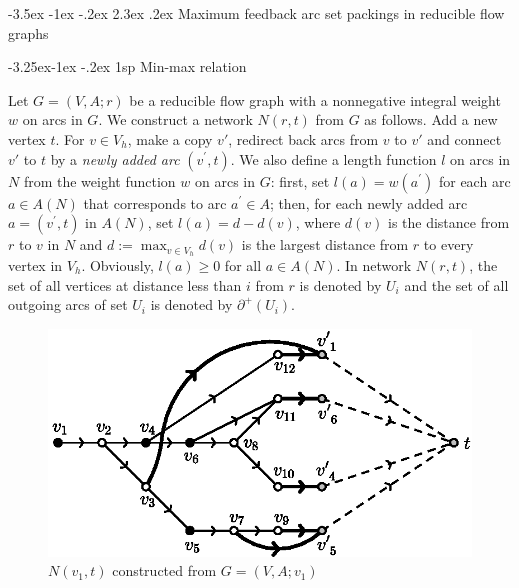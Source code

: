 \documentclass[11pt]{article}
\makeatletter
\renewcommand\section{%
  \@startsection{section}{1}
                {\z@}%
                {-3.5ex \@plus -1ex \@minus -.2ex}%
                {2.3ex \@plus.2ex}%
                {\large\bfseries}%
}
\renewcommand\subsection{%
  \@startsection{subsection}{2}
                {\z@}%
                {-3.25ex\@plus -1ex \@minus -.2ex}%
                {1sp}%
                {\normalsize\bfseries}%
}
\makeatother
\begin{document}
\section{Maximum feedback arc set packings in reducible flow graphs}
\label{sec:3}

\subsection{Min-max relation}
\label{sec:4}

Let $G=(V,A;r)$ be a reducible flow graph with a nonnegative integral weight $w$ on arcs in $G$. We construct a network $N(r,t)$ from $G$ as follows. Add a new vertex $t$. For $v\in V_h$, make a copy $v'$, redirect back arcs from $v$ to $v'$ and connect $v'$ to $t$ by a \emph{newly added arc} $(v^\prime,t)$. 
We also define a length function $l$ on arcs in $N$ from the weight function $w$ on arcs in $G$: first, set $l(a)=w(a^\prime)$ for each arc $a\in A(N)$ that corresponds to arc $a^\prime\in A$; then, for each newly added arc $a=(v^\prime,t)$ in $A(N)$, set $l(a)=d-d(v)$, where $d(v)$ is the distance from $r$ to $v$ in $N$ and $d:=\max_{v\in V_h} d(v)$ is the largest distance from $r$ to every vertex in $V_h$. Obviously, $l(a)\geq 0$ for all $a\in A(N)$. In network $N(r,t)$, the set of all vertices at distance less than $i$ from $r$ is denoted by $U_i$ and the set of all outgoing arcs of set $U_i$ is denoted by $\partial^+(U_i)$.

\begin{figure}
    \centering
    \includegraphics[scale=.8]{FASPacking-fig3.eps}
    \caption{$N(v_1,t)$ constructed from $G=(V,A;v_1)$}
     \label{fig:3}
 \end{figure}
\end{document}
